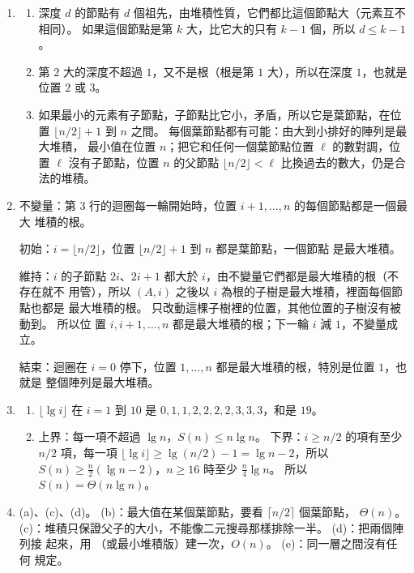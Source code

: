 \begin{enumerate}
\item
\begin{enumerate}
\item 深度 $d$ 的節點有 $d$ 個祖先，由堆積性質，它們都比這個節點大（元素互不相同）。
如果這個節點是第 $k$ 大，比它大的只有 $k - 1$ 個，所以 $d \le k - 1$。
\item 第 $2$ 大的深度不超過 $1$，又不是根（根是第 $1$ 大），所以在深度 $1$，也就是位置
$2$ 或 $3$。
\item 如果最小的元素有子節點，子節點比它小，矛盾，所以它是葉節點，在位置
$\lfloor n/2 \rfloor + 1$ 到 $n$ 之間。 每個葉節點都有可能：由大到小排好的陣列是最大堆積，
最小值在位置 $n$；把它和任何一個葉節點位置 $\ell$ 的數對調，位置 $\ell$ 沒有子節點，位置
$n$ 的父節點 $\lfloor n/2 \rfloor < \ell$ 比換過去的數大，仍是合法的堆積。
\end{enumerate}

\item 不變量：第 3 行的迴圈每一輪開始時，位置 $i + 1, \ldots, n$ 的每個節點都是一個最大
堆積的根。

初始：$i = \lfloor n/2 \rfloor$，位置 $\lfloor n/2 \rfloor + 1$ 到 $n$ 都是葉節點，一個節點
是最大堆積。

維持：$i$ 的子節點 $2i$、$2i + 1$ 都大於 $i$，由不變量它們都是最大堆積的根（不存在就不
用管），所以 $(A, i)$ 之後以 $i$ 為根的子樹是最大堆積，裡面每個節點也都是
最大堆積的根。  只改動這棵子樹裡的位置，其他位置的子樹沒有被動到。 所以位
置 $i, i + 1, \ldots, n$ 都是最大堆積的根；下一輪 $i$ 減 $1$，不變量成立。

結束：迴圈在 $i = 0$ 停下，位置 $1, \ldots, n$ 都是最大堆積的根，特別是位置 $1$，也就是
整個陣列是最大堆積。

\item
\begin{enumerate}
\item $\lfloor \lg i \rfloor$ 在 $i = 1$ 到 $10$ 是 $0, 1, 1, 2, 2, 2, 2, 3, 3, 3$，和是
$19$。
\item 上界：每一項不超過 $\lg n$，$S(n) \le n \lg n$。 下界：$i \ge n/2$ 的項有至少
$n/2$ 項，每一項 $\lfloor \lg i \rfloor \ge \lg(n/2) - 1 = \lg n - 2$，所以
$S(n) \ge \frac{n}{2}(\lg n - 2)$，$n \ge 16$ 時至少 $\frac{n}{4}\lg n$。 所以
$S(n) = \Theta(n \lg n)$。
\end{enumerate}

\item (a)、(c)、(d)。 (b)：最大值在某個葉節點，要看 $\lceil n/2 \rceil$ 個葉節點，
$\Theta(n)$。 (c)：堆積只保證父子的大小，不能像二元搜尋那樣排除一半。 (d)：把兩個陣列接
起來，用 （或最小堆積版）建一次，$O(n)$。 (e)：同一層之間沒有任何
規定。


\end{enumerate}
